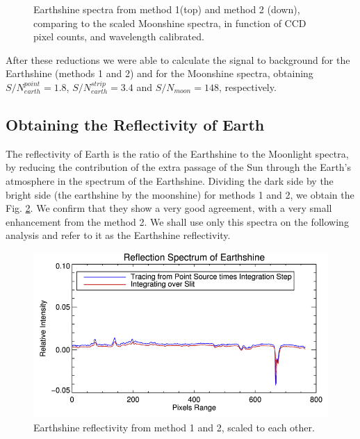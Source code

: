 \begin{figure}[htb]
\begin{center}
\caption{Earthshine spectra from method 1(top) and method 2 (down), comparing
to the scaled Moonshine spectra, in function of CCD pixel counts, and
wavelength calibrated.}
\label{comparing}
\end{center}
\end{figure}

After these
reductions we were able to calculate the signal
to background for
the Earthshine (methods 1 and 2) and for the Moonshine spectra, obtaining
$S/N^{point}_{earth} = 1.8$,  $S/N^{strip}_{earth} = 3.4$ and
$S/N_{moon} = 148$, respectively.

\subsection{Obtaining the Reflectivity of Earth}


The reflectivity of Earth is the ratio of the Earthshine to the Moonlight
spectra, \ie by reducing the contribution of the extra
passage of the Sun through the Earth's atmosphere in the spectrum of the
Earthshine. Dividing  the dark side by the bright side (the earthshine by the
 moonshine) for methods 1 and 2, we obtain the Fig. \ref{comparing2}. We
confirm that they show a very good agreement, with  a very small enhancement
from the method 2. We shall use only this spectra on the following analysis and
refer to it as the Earthshine reflectivity. 


\begin{figure}[htb]
\begin{center}
\includegraphics[scale=0.6]{plots/reflectivity0.png}
\caption{Earthshine reflectivity from method 1 and 2, scaled to each
other.}
\label{comparing2}
\end{center}
\end{figure}









